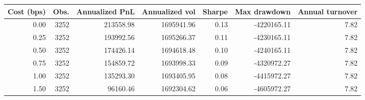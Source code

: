 \begin{tabular}{rrrrrrr}
\toprule
Cost (bps) & Obs. & Annualized PnL & Annualized vol & Sharpe & Max drawdown & Annual turnover \\
\midrule
0.00 & 3252 & 213558.98 & 1695941.96 & 0.13 & -4220165.11 & 7.82 \\
0.25 & 3252 & 193992.56 & 1695266.37 & 0.11 & -4230165.11 & 7.82 \\
0.50 & 3252 & 174426.14 & 1694618.48 & 0.10 & -4240165.11 & 7.82 \\
0.75 & 3252 & 154859.72 & 1693998.33 & 0.09 & -4320972.27 & 7.82 \\
1.00 & 3252 & 135293.30 & 1693405.95 & 0.08 & -4415972.27 & 7.82 \\
1.50 & 3252 & 96160.46 & 1692304.62 & 0.06 & -4605972.27 & 7.82 \\
\bottomrule
\end{tabular}
